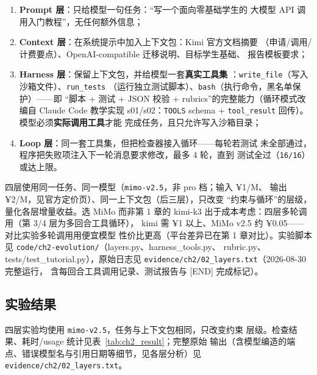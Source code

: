 \begin{enumerate}[leftmargin=4em,itemsep=0pt,topsep=2pt]
    \item \textbf{Prompt 层}：只给模型一句任务：``写一个面向零基础学生的
          大模型 API 调用入门教程''，无任何额外信息；
    \item \textbf{Context 层}：在系统提示中加入上下文包：Kimi 官方文档摘要
          （申请/调用/计费要点）、OpenAI-compatible 迁移说明、目标学生基础、
          报告模板要求；
    \item \textbf{Harness 层}：保留上下文包，并给模型一套\textbf{真实工具集
          }：\texttt{write\_file}（写入沙箱文件）、\texttt{run\_tests}
          （运行独立测试脚本）、\texttt{bash}（执行命令，黑名单保护）——即
          ``脚本 + 测试 + JSON 校验 + rubrics''的完整能力（循环模式改编自
          Claude Code 教学实现 s01/s02：\texttt{TOOLS} schema +
          \texttt{tool\_result} 回传）。模型必须\textbf{实际调用工具}才能
          完成任务，且只允许写入沙箱目录；
    \item \textbf{Loop 层}：同一套工具集，但把检查器接入循环——每轮若测试
          未全部通过，程序把失败项注入下一轮消息要求修改，最多 4 轮，直到
          测试全过（\texttt{16/16}）或达上限。
\end{enumerate}

四层使用同一任务、同一模型（\texttt{mimo-v2.5}，非 pro 档；输入 ¥1/M、
输出 ¥2/M，见官方定价页）、同一上下文包（后三层），只改变
``约束与循环''的层级，量化各层增量收益。选 MiMo 而非第 1 章的
kimi-k3 出于成本考虑：四层多轮调用（第 3/4 层为多回合工具循环），
kimi 需 ¥1 以上、MiMo v2.5 约 ¥0.05——对比实验多轮调用用便宜模型
性价比更高（平台差异已在第 1 章对比）。实验脚本见
\nolinkurl{code/ch2-evolution/}（layers.py、harness\_tools.py、
rubric.py、tests/test\_tutorial.py），原始日志见
\nolinkurl{evidence/ch2/02_layers.txt}（2026-08-30 完整运行，
含每回合工具调用记录、测试报告与 [END] 完成标记）。

\subsection{实验结果}

四层实验均使用 \texttt{mimo-v2.5}，任务与上下文包相同，只改变约束
层级。检查结果、耗时/usage 统计见表~\ref{tab:ch2_result}；完整原始
输出（含模型编造的端点、错误模型名与引用日期等细节，见各层分析）见
\nolinkurl{evidence/ch2/02_layers.txt}。

